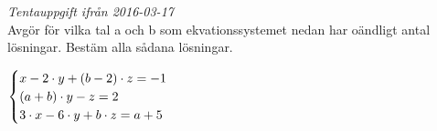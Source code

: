 \textit{Tentauppgift ifrån 2016-03-17} \\
Avgör för vilka tal a och b som ekvationssystemet nedan har oändligt antal lösningar. Bestäm alla sådana lösningar.

\begin{math}
	\begin{cases}
	x - 2 \cdot y  + (b - 2) \cdot z = -1 \\
	(a + b) \cdot y -z = 2 \\
	3 \cdot x - 6 \cdot y  + b \cdot z = a + 5 \\
	\end{cases}
	\\
	\\
\end{math}